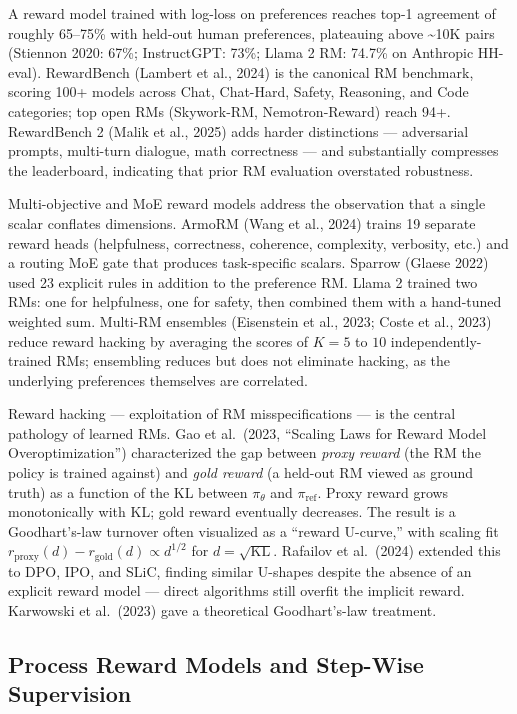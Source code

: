 A reward model trained with log-loss on preferences reaches top-1 agreement of roughly 65--75\% with held-out human preferences, plateauing above \textasciitilde10K pairs (Stiennon 2020: 67\%; InstructGPT: 73\%; Llama 2 RM: 74.7\% on Anthropic HH-eval). RewardBench (Lambert et al., 2024) is the canonical RM benchmark, scoring 100+ models across Chat, Chat-Hard, Safety, Reasoning, and Code categories; top open RMs (Skywork-RM, Nemotron-Reward) reach 94+. RewardBench 2 (Malik et al., 2025) adds harder distinctions --- adversarial prompts, multi-turn dialogue, math correctness --- and substantially compresses the leaderboard, indicating that prior RM evaluation overstated robustness.

Multi-objective and MoE reward models address the observation that a single scalar conflates dimensions. ArmoRM (Wang et al., 2024) trains 19 separate reward heads (helpfulness, correctness, coherence, complexity, verbosity, etc.) and a routing MoE gate that produces task-specific scalars. Sparrow (Glaese 2022) used 23 explicit rules in addition to the preference RM. Llama 2 trained two RMs: one for helpfulness, one for safety, then combined them with a hand-tuned weighted sum. Multi-RM ensembles (Eisenstein et al., 2023; Coste et al., 2023) reduce reward hacking by averaging the scores of \(K = 5\) to \(10\) independently-trained RMs; ensembling reduces but does not eliminate hacking, as the underlying preferences themselves are correlated.

Reward hacking --- exploitation of RM misspecifications --- is the central pathology of learned RMs. Gao et al.~(2023, ``Scaling Laws for Reward Model Overoptimization'') characterized the gap between \emph{proxy reward} (the RM the policy is trained against) and \emph{gold reward} (a held-out RM viewed as ground truth) as a function of the KL between \(\pi_\theta\) and \(\pi_{\text{ref}}\). Proxy reward grows monotonically with KL; gold reward eventually decreases. The result is a Goodhart's-law turnover often visualized as a ``reward U-curve,'' with scaling fit \(r_{\text{proxy}}(d) - r_{\text{gold}}(d) \propto d^{1/2}\) for \(d = \sqrt{\mathrm{KL}}\). Rafailov et al.~(2024) extended this to DPO, IPO, and SLiC, finding similar U-shapes despite the absence of an explicit reward model --- direct algorithms still overfit the implicit reward. Karwowski et al.~(2023) gave a theoretical Goodhart's-law treatment.

\subsection{Process Reward Models and Step-Wise Supervision}\label{process-reward-models-and-step-wise-supervision}

